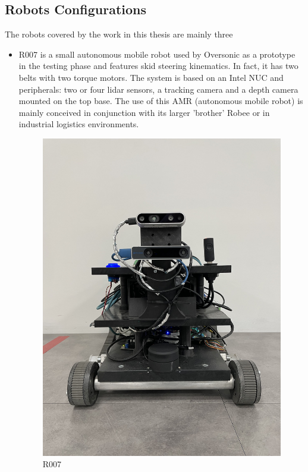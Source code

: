 \subsection{Robots Configurations}
The robots covered by the work in this thesis are mainly three 
\begin{itemize}
    \item R007 is a small autonomous mobile robot used by Oversonic as a prototype in the testing phase and features skid steering kinematics. In fact, it has two belts with two torque motors. The system is based on an Intel NUC and peripherals: two or four lidar sensors, a tracking camera and a depth camera mounted on the top base. The use of this AMR (autonomous mobile robot) is mainly conceived in conjunction with its larger 'brother' Robee or in industrial logistics environments.
    \begin{figure}[H]
        \centering
        \includegraphics[scale=0.03]{Images/Chapter 3/r007.jpg}
        \caption{R007}

\end{figure}
\end{itemize}

